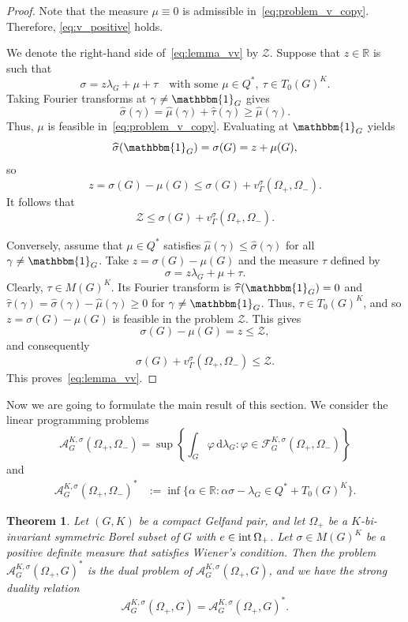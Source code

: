 \documentclass[[a4paper,english,12pt]{amsart}
\theoremstyle{plain}
\newtheorem{theorem}{Theorem}
\theoremstyle{remark}
\newcommand{\intt}{\mbox{\rm int\,}}
\newcommand{\RR}{\mathbb R}
\begin{document}
\begin{proof}
Note that the measure $\mu \equiv 0$ is admissible in~\eqref{eq:problem_v_copy}. Therefore, \eqref{eq:v_positive} holds.

We denote the right-hand side of~\eqref{eq:lemma_vv} by $\mathcal{Z}$.
Suppose that $z \in \RR$ is such that
\[
\sigma = z\lambda_G+\mu+\tau \quad \text{with some } \mu\in Q^*, \ \tau \in T_0(G)^K.
\]
Taking Fourier transforms at $\gamma\neq \mathbbm{1}_G$ gives
\[
\widehat{\sigma}(\gamma) = \widehat{\mu}(\gamma) + \widehat{\tau}(\gamma) \ge \widehat{\mu}(\gamma).
\]
Thus, $\mu$ is feasible in~\eqref{eq:problem_v_copy}.
Evaluating at $\mathbbm{1}_G$ yields
\[
\widehat{\sigma}(\mathbbm{1}_G) = \sigma(G) = z + \mu(G),
\]
so
\[
z = \sigma(G) - \mu(G) \le \sigma(G) + v_\Gamma^{\sigma}(\Omega_+, \Omega_-).
\]
It follows that
$$
\mathcal{Z} \le \sigma(G) + v_\Gamma^{\sigma}(\Omega_+, \Omega_-).
$$

Conversely, assume that $\mu\in Q^*$ satisfies  $\widehat{\mu}(\gamma)\le \widehat{\sigma}(\gamma)$ for all $\gamma\neq \mathbbm{1}_G$. Take $z = \sigma(G) - \mu(G)$ and the measure $\tau$ defined by
\[
\sigma = z\lambda_G + \mu + \tau.
\]
Clearly, $\tau \in M(G)^K$. Its Fourier transform is $\widehat{\tau}(\mathbbm{1}_G) = 0$ and $\widehat{\tau}(\gamma) = \widehat{\sigma}(\gamma) - \widehat{\mu}(\gamma) \ge 0$ for $\gamma\neq \mathbbm{1}_G$. 
Thus, $\tau \in T_0(G)^K$, and so $z = \sigma(G) - \mu(G)$ is feasible in the problem $\mathcal{Z}$. This gives
$$
\sigma(G) - \mu(G) = z \le \mathcal{Z},
$$
and consequently 
$$
\sigma (G) + v_\Gamma^{\sigma}(\Omega_+, \Omega_-) \le \mathcal{Z}.
$$
This proves~\eqref{eq:lemma_vv}.
\end{proof}

Now we are going to formulate the main result of this section. We consider the linear programming problems
\begin{equation*}
{\mathcal{A}}^{K, \sigma}_G(\Omega_+, \Omega_-) = \sup \left\{ \int_G\varphi\,\mathrm{d}\lambda_G : \varphi \in \mathcal{F}^{K,\sigma}_G(\Omega_+, \Omega_-) \right\}
\end{equation*}
and
\begin{align*}
{\mathcal{A}}^{K, \sigma}_G(\Omega_+, \Omega_-)^{*}  
& := \inf \{ \alpha \in \RR : \alpha \sigma - \lambda_G \in Q^* + T_0(G)^K \}.
\end{align*} 

\begin{theorem} \label{theorem:main_duality_G}
Let $(G,K)$ be a compact Gelfand pair, and let $\Omega_+$ be a $K$-bi-invariant symmetric Borel subset of $G$ with $e \in \intt{\Omega_+}$. Let $\sigma \in M(G)^K$ be a positive definite measure that satisfies Wiener's condition. Then the problem ${\mathcal{A}}^{K, \sigma}_G(\Omega_+, G)^{*}$ is the dual problem of ${\mathcal{A}}^{K, \sigma}_G(\Omega_+, G)$, and we have the strong duality relation
\begin{equation*}
   {\mathcal{A}}^{K, \sigma}_G(\Omega_+, G) = {\mathcal{A}}^{K, \sigma}_G(\Omega_+, G)^{*}.
\end{equation*}
\end{theorem}
\end{document}
